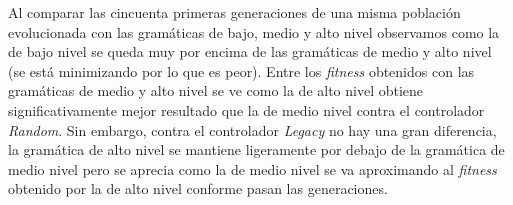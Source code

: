 Al comparar las cincuenta primeras generaciones de una misma población evolucionada con las gramáticas de bajo, medio y alto nivel observamos como la de bajo nivel se queda muy por encima de las gramáticas de medio y alto nivel (se está minimizando por lo que es peor). Entre los \textit{fitness} obtenidos con las gramáticas de medio y alto nivel se ve como la de alto nivel obtiene significativamente mejor resultado que la de medio nivel contra el controlador \textit{Random}. Sin embargo, contra el controlador \textit{Legacy} no hay una gran diferencia, la gramática de alto nivel se mantiene ligeramente por debajo de la gramática de medio nivel pero se aprecia como la de medio nivel se va aproximando al \textit{fitness} obtenido por la de alto nivel conforme pasan las generaciones.